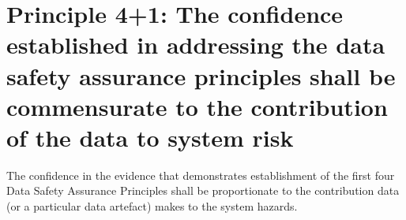 \section{Principle 4+1: The confidence established in addressing the data safety assurance principles shall be commensurate to the contribution of the data to system risk}
The confidence in the evidence that demonstrates establishment of the first four Data Safety Assurance Principles shall be proportionate to the contribution data (or a particular \gls{data artefact}) makes to the system hazards.